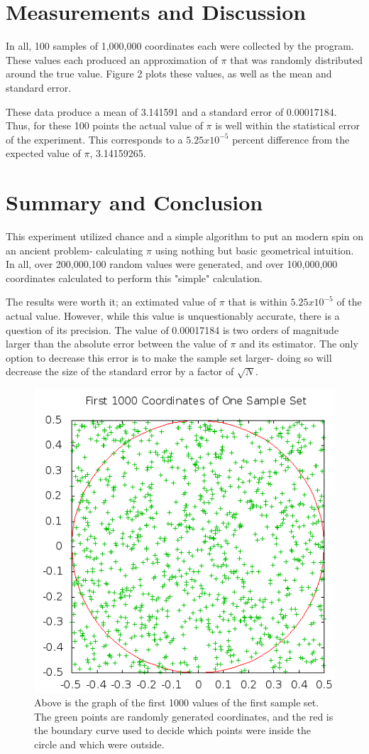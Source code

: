 \documentclass[twocolumn,prb,amsmath,amssymb,amsfonts]{revtex4}
\begin{document}
\section{Measurements and Discussion}

In all, 100 samples of 1,000,000 coordinates each were collected by the program. These values each produced an approximation of $\pi$ that was randomly distributed around the true value. Figure 2 plots these values, as well as the mean and standard error.

These data produce a mean of 3.141591 and a standard error of 0.00017184. Thus, for these 100 points the actual value of $\pi$ is well within the statistical error of the experiment. This corresponds to a $5.25x10^{-5}$ percent difference from the expected value of $\pi$, 3.14159265. 

\section{Summary and Conclusion}
This experiment utilized chance and a simple algorithm to put an modern spin on an ancient problem- calculating $\pi$ using nothing but basic geometrical intuition. In all, over 200,000,100 random values were generated, and over 100,000,000 coordinates calculated to perform this "simple" calculation. 

The results were worth it; an extimated value of $\pi$ that is within $5.25x10^{-5}$ of the actual value. However, while this value is unquestionably accurate, there is a question of its precision. The value of 0.00017184 is two orders of magnitude larger than the absolute error between the value of $\pi$ and its estimator. The only option to decrease this error is to make the sample set larger- doing so will decrease the size of the standard error by a factor of $\sqrt{N}$.

\begin{figure}
\includegraphics*[width=4.0 in]{out.png}
\caption{Above is the graph of the first 1000 values of the first sample set. The green points are randomly generated coordinates, and the red is the boundary curve used to decide which points were inside the circle and which were outside.}
\end{figure}
\end{document}
